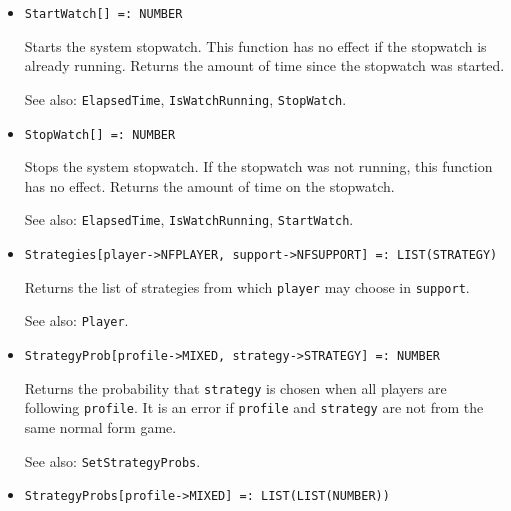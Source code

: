 \begin{itemize}
\item{}
\protect \large \begin{verbatim}
StartWatch[] =: NUMBER 
\end{verbatim}\normalsize

\bd
Starts the system stopwatch.  This function has no
effect if the stopwatch is already running.
Returns the amount of time since the stopwatch was started.
\item [See also:] \verb+ElapsedTime+, \verb+IsWatchRunning+, \verb+StopWatch+.
\ed

\item{}
\protect \large \begin{verbatim}
StopWatch[] =: NUMBER 
\end{verbatim}\normalsize

\bd
Stops the system stopwatch.  If the stopwatch was not
running, this function has no effect.  Returns the amount of time
on the stopwatch.
\item [See also:] \verb+ElapsedTime+, \verb+IsWatchRunning+,
\verb+StartWatch+.
\ed

\item{}
\protect \large \begin{verbatim}
Strategies[player->NFPLAYER, support->NFSUPPORT] =: LIST(STRATEGY) 
\end{verbatim}\normalsize

\bd
Returns the list of strategies from which  \verb+player+ may choose
in \verb+support+.
\item [See also:] \verb+Player+. 
\ed

\item{}
\protect \large \begin{verbatim}
StrategyProb[profile->MIXED, strategy->STRATEGY] =: NUMBER 
\end{verbatim} \normalsize

\bd
Returns the probability that \verb+strategy+ is chosen when all
players are following \verb+profile+.  It is an error if \verb+profile+
and \verb+strategy+ are not from the same normal form game.
\item [See also:] \verb+SetStrategyProbs+.
\ed

\item{}
\protect \large \begin{verbatim}
StrategyProbs[profile->MIXED] =: LIST(LIST(NUMBER)) 
\end{verbatim} \normalsize


\end{itemize}
